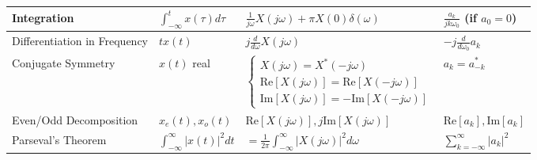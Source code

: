 \documentclass[8pt]{extarticle}
\begin{document}
\begin{table}[h]
\begin{tabular}{|l|l|l|l|}
        Integration                  & $\int_{-\infty}^t x(\tau) d\tau$      & $\frac{1}{j\omega} X(j\omega) + \pi X(0) \delta(\omega)$                          & $\frac{a_k}{j k \omega_0}$ (if $a_0 = 0$) \\ \hline
        Differentiation in Frequency & $t x(t)$                              & $j \frac{d}{d\omega} X(j\omega)$                                                  & $-j \frac{d}{d\omega_0} a_k$              \\ \hline
        Conjugate Symmetry           & $x(t)$ real                           & $\begin{cases}
                                                                                        X(j\omega) = X^*(-j\omega)                     \\
                                                                                        \text{Re}[X(j\omega)] = \text{Re}[X(-j\omega)] \\
                                                                                        \text{Im}[X(j\omega)] = -\text{Im}[X(-j\omega)]
                                                                                    \end{cases}$                                 & $a_k = a^*_{-k}$                                                              \\ \hline
        Even/Odd Decomposition       & $x_e(t), x_o(t)$                      & $\text{Re}[X(j\omega)], j \text{Im}[X(j\omega)]$                                  & $\text{Re}[a_k], \text{Im}[a_k]$          \\ \hline
        Parseval's Theorem           & $\int_{-\infty}^{\infty} |x(t)|^2 dt$ & $= \frac{1}{2\pi} \int_{-\infty}^{\infty} |X(j\omega)|^2 d\omega$                 & $\sum_{k=-\infty}^{\infty} |a_k|^2$       \\ \hline
    \end{tabular}
\end{table}
\end{document}
